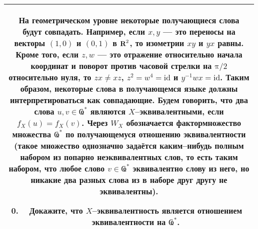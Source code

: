 \begin{center}
\begin{tabular}{|c|}
\hline
	\begin{minipage}{0.85\textwidth}
\medskip
На геометрическом уровне некоторые получающиеся слова будут совпадать. Например, если $x,y$ --- это переносы на векторы $(1,0)$ и $(0,1)$ в $\text{\bfseries R}^2$, то изометрии $xy$ и $yx$ равны. Кроме того, если $z,w$ --- это отражение относительно начала координат и поворот против часовой стрелки на $\text{π}/2$ относительно нуля, то $zx \neq xz$, $z^2 = w^4 = \textrm{id}$ и $y^{-1}wx = \textrm{id}$. Таким образом, некоторые слова в получающемся языке должны интерпретироваться как совпадающие. Будем говорить, что два слова $u,v \in \text{Ҩ}^*$ являются $X$--эквивалентными, если $f_X(u)=f_X(v)$. Через $W_X$ обозначается фактормножество множества $\text{Ҩ}^*$ по получающемуся отношению эквивалентности (такое множество однозначно задаётся каким--нибудь полным набором из попарно неэквивалентных слов, то есть таким набором, что любое слово $v \in \text{Ҩ}^*$ эквивалентно слову из него, но никакие два разных слова из в наборе друг другу не эквивалентны).
\begin{enumerate} \setcounter{enumi}{-1}
\item Докажите, что $X$--эквивалентность является отношением эквивалентности на $\text{Ҩ}^*$.
\end{enumerate} \smallskip
	\end{minipage} \\
\hline
\end{tabular}
\end{center} \vspace{0.8cm}

